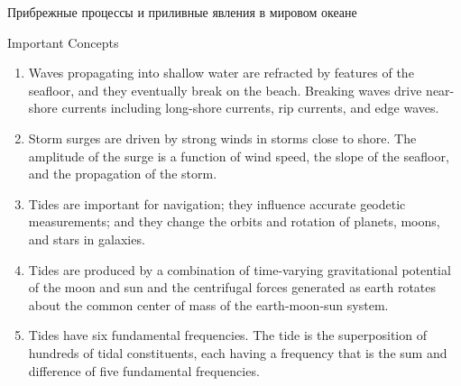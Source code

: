 \begin{chapter}{Прибрежные процессы и приливные явления в мировом океане}
\begin{section}{Important Concepts}
\begin{enumerate}
\item 
Waves propagating into shallow water are refracted by features of the
seafloor, and they eventually break on the beach. Breaking waves drive
near-shore currents including long-shore currents, rip
currents, and edge waves.
%

\item 
Storm surges are driven by strong winds in storms close to shore. The
amplitude of the surge is a function of wind speed, the slope of the
seafloor, and the propagation of the storm.
%

\item 
Tides are important for navigation; they influence accurate geodetic
measurements; and they change the orbits and rotation of planets,
moons, and stars in galaxies.
%

\item 
Tides are produced by a combination of time-varying gravitational
potential of the moon and sun and the centrifugal forces generated as
earth rotates about the common center of mass of the earth-moon-sun
system.
%

\item 
Tides have six fundamental frequencies. The tide is the superposition
of hundreds of tidal constituents, each having a frequency that is the
sum and difference of five fundamental frequencies.
%


\end{enumerate}
\end{section}
\end{chapter}
